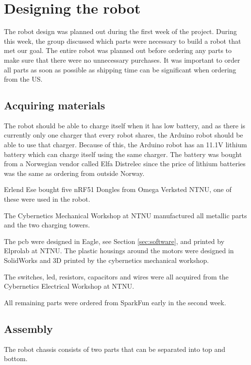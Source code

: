 \section{Designing the robot}
\label{sec:robotdesign}
The robot design was planned out during the first week of the project. During this week, the group discussed which parts were necessary to build a robot that met our goal. The entire robot was planned out before ordering any parts to make sure that there were no unnecessary purchases. It was important to order all parts as soon as possible as shipping time can be significant when ordering from the US.

\subsection{Acquiring materials}
The robot should be able to charge itself when it has low battery, and as there is currently only one charger that every robot shares, the Arduino robot should be able to use that charger. Because of this, the Arduino robot has an 11.1V lithium battery which can charge itself using the same charger. The battery was bought from a Norwegian vendor called Elfa Distrelec\cite{elfa} since the price of lithium batteries was the same as ordering from outside Norway.

Erlend Ese bought five nRF51 Dongles from Omega Verksted NTNU, one of these were used in the robot.

The Cybernetics Mechanical Workshop at NTNU manufactured all metallic parts and the two charging towers.

The \acrshort{pcb} were designed in Eagle, see Section \ref{sec:software}, and printed by Elprolab\cite{elprolab} at NTNU. The plastic housings around the motors were designed in SolidWorks and 3D printed by the cybernetics mechanical workshop.

The switches, \acrfull{led}, resistors, capacitors and wires were all acquired from the Cybernetics Electrical Workshop at NTNU.

All remaining parts were ordered from SparkFun early in the second week.


\subsection{Assembly}
The robot chassis consists of two parts that can be separated into top and bottom.

